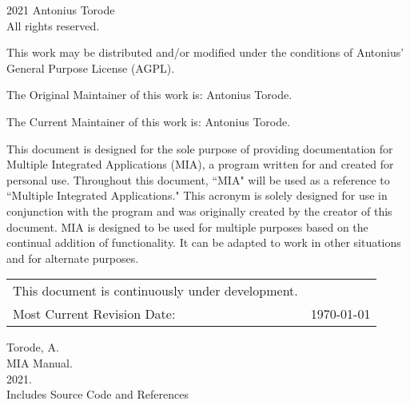 \pagestyle{empty}
\begingroup
\footnotesize
\parindent 0pt
\parskip \baselineskip
\textcopyright{} 2021 Antonius Torode \\
All rights reserved.

This work may be distributed and/or modified under the conditions of Antonius’ General Purpose License (AGPL).

The Original Maintainer of this work is: Antonius Torode.

The Current Maintainer of this work is: Antonius Torode.

This document is designed for the sole purpose of providing documentation for Multiple Integrated Applications (MIA), a program written for and created for personal use. Throughout this document, ``MIA" will be used as a reference to ``Multiple Integrated Applications." This acronym is solely designed for use in conjunction with the program and was originally created by the creator of this document. MIA is designed to be used for multiple purposes based on the continual addition of functionality. It can be adapted to work in other situations and for alternate purposes.


\begin{center}
\begin{tabular}{ll}
This document is continuously under development. \\
Most Current Revision Date: &  \today 
\end{tabular}
\end{center}

\vfill

Torode, A.\\
\hspace*{1em} MIA Manual. \\
\hspace*{2em} 2021. \\
\hspace*{2em} Includes Source Code and References \\


\endgroup
\clearpage
